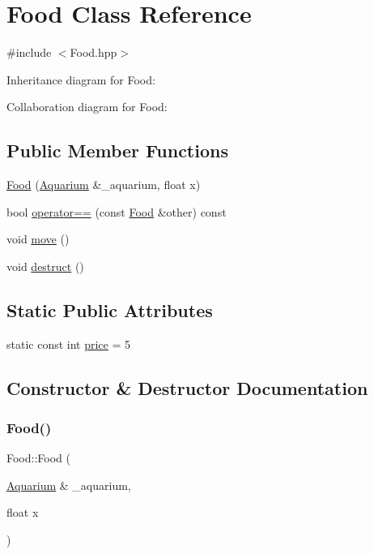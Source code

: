 \hypertarget{class_food}{}\section{Food Class Reference}
\label{class_food}


{\ttfamily \#include $<$Food.\+hpp$>$}



Inheritance diagram for Food\+:


Collaboration diagram for Food\+:
\subsection*{Public Member Functions}
\begin{DoxyCompactItemize}
\item 
\mbox{\hyperlink{class_food_ad36b16582fc56aa938f50870f5ec6b52}{Food}} (\mbox{\hyperlink{class_aquarium}{Aquarium}} \&\+\_\+aquarium, float x)
\item 
bool \mbox{\hyperlink{class_food_a7199d2bd48ecae8ffbbf1be8a39c5311}{operator==}} (const \mbox{\hyperlink{class_food}{Food}} \&other) const
\item 
void \mbox{\hyperlink{class_food_afb37f87b673df87697665ae82b6da0da}{move}} ()
\item 
void \mbox{\hyperlink{class_food_a5e1bfe34f8a4f4ce60accc57212c95c8}{destruct}} ()
\end{DoxyCompactItemize}
\subsection*{Static Public Attributes}
\begin{DoxyCompactItemize}
\item 
static const int \mbox{\hyperlink{class_food_af54f2090e84e95fcdc95f5c2d93386df}{price}} = 5
\end{DoxyCompactItemize}


\subsection{Constructor \& Destructor Documentation}
\mbox{\label{class_food_ad36b16582fc56aa938f50870f5ec6b52}} 
\subsubsection{\texorpdfstring{Food()}{Food()}}
{\footnotesize\ttfamily Food\+::\+Food (\begin{DoxyParamCaption}\item[{\mbox{\hyperlink{class_aquarium}{Aquarium}} \&}]{\+\_\+aquarium,  }\item[{float}]{x }\end{DoxyParamCaption})}



